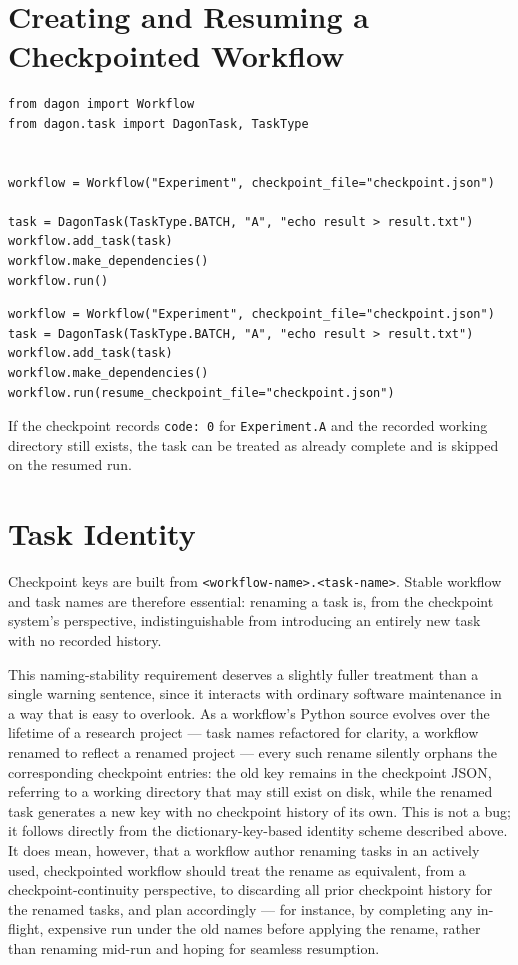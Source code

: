 \section{Creating and Resuming a Checkpointed Workflow}

\begin{lstlisting}[caption={Creation.}]
from dagon import Workflow
from dagon.task import DagonTask, TaskType


workflow = Workflow("Experiment", checkpoint_file="checkpoint.json")

task = DagonTask(TaskType.BATCH, "A", "echo result > result.txt")
workflow.add_task(task)
workflow.make_dependencies()
workflow.run()
\end{lstlisting}

\begin{lstlisting}[caption={Resumption.}]
workflow = Workflow("Experiment", checkpoint_file="checkpoint.json")
task = DagonTask(TaskType.BATCH, "A", "echo result > result.txt")
workflow.add_task(task)
workflow.make_dependencies()
workflow.run(resume_checkpoint_file="checkpoint.json")
\end{lstlisting}

If the checkpoint records \texttt{code: 0} for \texttt{Experiment.A} and the
recorded working directory still exists, the task can be treated as already
complete and is skipped on the resumed run.

\section{Task Identity}

Checkpoint keys are built from \texttt{<workflow-name>.<task-name>}. Stable
workflow and task names are therefore essential: renaming a task is, from
the checkpoint system's perspective, indistinguishable from introducing an
entirely new task with no recorded history.

This naming-stability requirement deserves a slightly fuller treatment than
a single warning sentence, since it interacts with ordinary software
maintenance in a way that is easy to overlook. As a workflow's Python source
evolves over the lifetime of a research project --- task names refactored
for clarity, a workflow renamed to reflect a renamed project --- every such
rename silently orphans the corresponding checkpoint entries: the old key
remains in the checkpoint JSON, referring to a working directory that may
still exist on disk, while the renamed task generates a new key with no
checkpoint history of its own. This is not a bug; it follows directly from
the dictionary-key-based identity scheme described above. It does mean,
however, that a workflow author renaming tasks in an actively used,
checkpointed workflow should treat the rename as equivalent, from a
checkpoint-continuity perspective, to discarding all prior checkpoint
history for the renamed tasks, and plan accordingly --- for instance, by
completing any in-flight, expensive run under the old names before applying
the rename, rather than renaming mid-run and hoping for seamless resumption.


